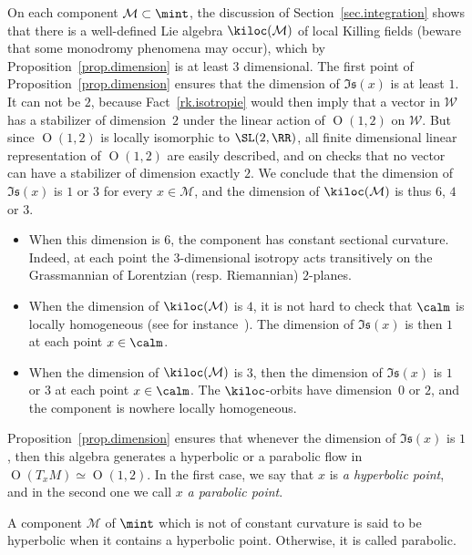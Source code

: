 On each component ${\mathcal M} \subset \mint$, the discussion of Section~\ref{sec.integration} shows that there is a well-defined Lie algebra $\kiloc({\mathcal M})$ of local Killing fields (beware that some monodromy phenomena may occur), which by Proposition~\ref{prop.dimension} is at least $3$ dimensional. The first point of Proposition~\ref{prop.dimension} ensures that the dimension of $\mathfrak{Is}(x)$ is at least $1$. It can not be $2$, because Fact~\ref{rk.isotropie} would then imply that a vector in $\mathcal{W}$ has a stabilizer of dimension~$2$ under the linear action of ${\operatorname O}(1,2)$ on $\mathcal{W}$. But since ${\operatorname O}(1,2)$ is locally isomorphic to $\SL(2,\RR)$, all finite dimensional linear representation of ${\operatorname O}(1,2)$ are easily described, and on checks that no vector can have a stabilizer of dimension exactly $2$. We conclude that the dimension of $\mathfrak{Is}(x)$ is $1$ or $3$ for every $x \in {\mathcal M}$, and the dimension of $\kiloc({\mathcal M})$ is thus $6$, $4$ or $3$.
\begin{itemize}
\item \label{list3.5.a} When this dimension is $6$, the component has constant sectional curvature. Indeed, at each point the $3$-dimensional isotropy acts transitively on the Grassmannian of Lorentzian (resp. Riemannian) $2$-planes.
\item \label{list3.5.b} When the dimension of $\kiloc({\mathcal M})$ is $4$, it is not hard to check that $\calm$ is locally homogeneous (see for instance~\cite[Lemma~4]{sorin.karin}). The dimension of $\mathfrak{Is}(x)$ is then $1$ at each point $x \in \calm$.
\item \label{list3.5.c} When the dimension of $\kiloc({\mathcal M})$ is $3$, then the dimension of $\mathfrak{Is}(x)$ is $1$ or $3$ at each point $x \in \calm$. The $\kiloc$-orbits have dimension~$0$ or $2$, and the component is nowhere locally homogeneous.
\end{itemize}


Proposition~\ref{prop.dimension} ensures that whenever the dimension of $\mathfrak{Is}(x)$ is $1$, then this algebra generates a hyperbolic or a parabolic flow in ${\operatorname O}(T_xM) \simeq {\operatorname O}(1,2)$. In the first case, we say that $x$ is \emph{a hyperbolic point}, and in the second one we call $x$ \emph{a parabolic point}.

\begin{defi}
A component ${\mathcal M}$ of $\mint$ which is not of constant curvature is said to be hyperbolic when it contains a hyperbolic point. Otherwise, it is called parabolic.
\end{defi}

